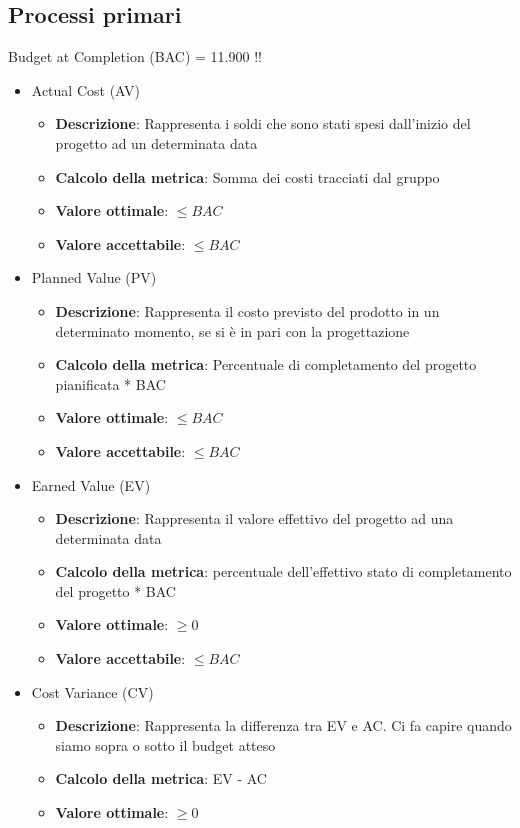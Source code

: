 \documentclass[12pt]{article}
\begin{document}
\subsection{Processi primari}
Budget at Completion (BAC) = 11.900 !!
\begin{itemize}
	\item Actual Cost (AV)
	\begin{itemize}
		\item \textbf{Descrizione}: Rappresenta i soldi che sono stati spesi dall'inizio del progetto ad un determinata data
		\item \textbf{Calcolo della metrica}: Somma dei costi tracciati dal gruppo
		\item \textbf{Valore ottimale}: $\le BAC$
		\item \textbf{Valore accettabile}: $\le BAC$
	\end{itemize}
	\item Planned Value (PV) 
	\begin{itemize}
		\item \textbf{Descrizione}: Rappresenta il costo previsto del prodotto in un determinato momento, se si è in pari con la progettazione
		\item \textbf{Calcolo della metrica}: Percentuale di completamento del progetto pianificata * BAC
		\item \textbf{Valore ottimale}: $\le BAC$
		\item \textbf{Valore accettabile}: $\le BAC$
	\end{itemize}
	\item Earned Value (EV)
	\begin{itemize}
		\item \textbf{Descrizione}: Rappresenta il valore effettivo del progetto ad una determinata data
		\item \textbf{Calcolo della metrica}: percentuale dell'effettivo stato di completamento del progetto * BAC 
		\item \textbf{Valore ottimale}: $\ge 0$ 
		\item \textbf{Valore accettabile}: $\le BAC$
	\end{itemize}
	\item Cost Variance (CV)
	\begin{itemize}
		\item \textbf{Descrizione}: Rappresenta la differenza tra EV e AC. Ci fa capire quando siamo sopra o sotto il budget atteso
		\item \textbf{Calcolo della metrica}:  EV - AC
		\item \textbf{Valore ottimale}: $\ge 0$

\end{itemize}
\end{itemize}
\end{document}
